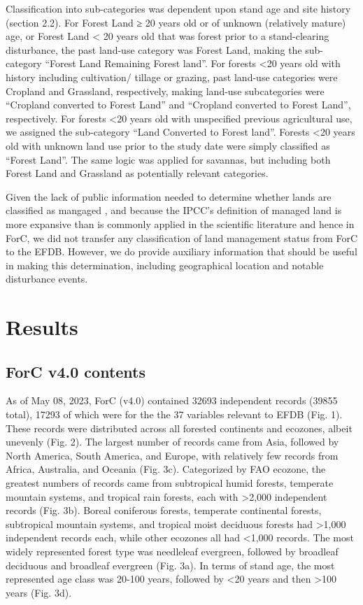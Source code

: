 \documentclass[, manuscript]{copernicus}
\begin{document}
Classification into sub-categories was dependent upon stand age and site
history (section 2.2). For Forest Land ≥ 20 years old or of unknown
(relatively mature) age, or Forest Land \textless{} 20 years old that
was forest prior to a stand-clearing disturbance, the past land-use
category was Forest Land, making the sub-category ``Forest Land
Remaining Forest land''. For forests \textless20 years old with history
including cultivation/ tillage or grazing, past land-use categories were
Cropland and Grassland, respectively, making land-use subcategories were
``Cropland converted to Forest Land'' and ``Cropland converted to Forest
Land'', respectively. For forests \textless20 years old with unspecified
previous agricultural use, we assigned the sub-category ``Land Converted
to Forest land''. Forests \textless20 years old with unknown land use
prior to the study date were simply classified as ``Forest Land''. The
same logic was applied for savannas, but including both Forest Land and
Grassland as potentially relevant categories.

Given the lack of public information needed to determine whether lands
are classified as mangaged
\citep{ogle_delineating_2018, deng_comparing_2021}, and because the
IPCC's definition of managed land is more expansive than is commonly
applied in the scientific literature and hence in ForC, we did not
transfer any classification of land management status from ForC to the
EFDB. However, we do provide auxiliary information that should be useful
in making this determination, including geographical location and
notable disturbance events.

\section{Results}

\subsection{ForC v4.0 contents}

As of May 08, 2023, ForC (v4.0) contained 32693 independent records
(39855 total), 17293 of which were for the the 37 variables relevant to
EFDB (Fig. 1). These records were distributed across all forested
continents and ecozones, albeit unevenly (Fig. 2). The largest number of
records came from Asia, followed by North America, South America, and
Europe, with relatively few records from Africa, Australia, and Oceania
(Fig. 3c). Categorized by FAO ecozone, the greatest numbers of records
came from subtropical humid forests, temperate mountain systems, and
tropical rain forests, each with \textgreater2,000 independent records
(Fig. 3b). Boreal coniferous forests, temperate continental forests,
subtropical mountain systems, and tropical moist deciduous forests had
\textgreater1,000 independent records each, while other ecozones all had
\textless1,000 records. The most widely represented forest type was
needleleaf evergreen, followed by broadleaf deciduous and broadleaf
evergreen (Fig. 3a). In terms of stand age, the most represented age
class was 20-100 years, followed by \textless20 years and then
\textgreater100 years (Fig. 3d).
\end{document}
